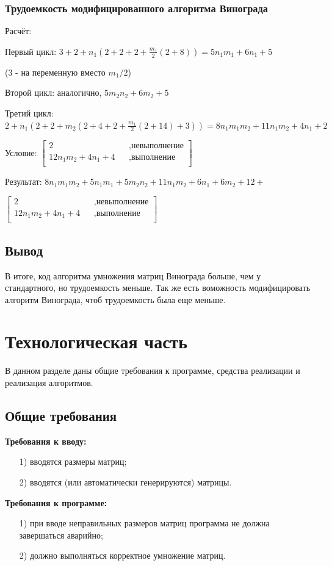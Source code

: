 \documentclass[12pt]{report}
\begin{document}
	\subsection{Трудоемкость модифицированного алгоритма Винограда}
	Расчёт:\par
	Первый цикл: $3 + 2 + n_1(2 + 2 + 2 + \frac{m_1}{2}(2 + 8)) = 5n_1m_1 + 6n_1 + 5$ \par(3 - на переменную вместо $m_1 / 2$)\par
	Второй цикл: аналогично, $5m_2n_2 + 6m_2 + 5$\par
	Третий цикл: $2 + n_1(2 + 2 + m_2(2 + 4 + 2 + \frac{m_1}{2}(2 + 14) + 3)) = 8n_1m_1m_2 + 11n_1m_2 + 4n_1 + 2$ \par
	Условие:
	$\begin{bmatrix}
		2    &&, \text{невыполнение}\\
		12n_1m_2 + 4n_1 + 4 &&, \text{выполнение}\\
	\end{bmatrix} $
	\par
	Результат: $8n_1m_1m_2 + 5n_1m_1 + 5m_2n_2 + 11n_1m_2 + 6n_1 + 6m_2 + 12 + $\par
	$\begin{bmatrix}
		2    &&, \text{невыполнение}\\
		12n_1m_2 + 4n_1 + 4 &&, \text{выполнение}\\
	\end{bmatrix} $ 

	\section*{Вывод}
	В итоге, код алгоритма умножения матриц Винограда больше, чем у стандартного, но трудоемкость меньше. Так же есть воможность модифицировать алгоритм Винограда, чтоб трудоемкость была еще меньше.
	
	
	\chapter{Технологическая часть}
	В данном разделе даны общие требования к программе, средства реализации и реализация алгоритмов.
	\section{Общие требования}
	\textbf{Требования к вводу:}
	\begin{enumerate}
		\item[1)] вводятся размеры матриц;
		\item[2)] вводятся (или автоматически генерируются) матрицы.
	\end{enumerate}
	\noindent\textbf{Требования к программе:}
	\begin{enumerate}
		\item[1)] при вводе неправильных размеров матриц программа не должна завершаться аварийно;
		\item[2)] должно выполняться корректное умножение матриц.
	\end{enumerate}
\end{document}

